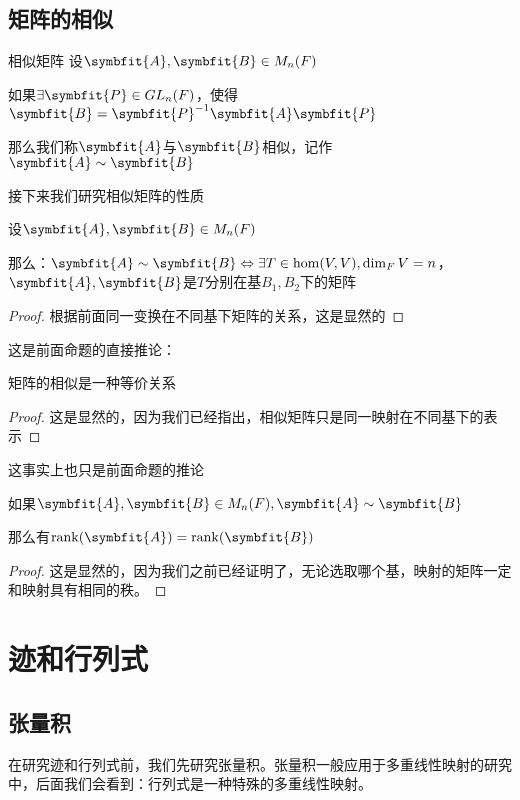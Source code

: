 \documentclass[12pt, a4paper, oneside, UTF8]{ctexbook}
\begin{document}
		\subsection{矩阵的相似}
			\begin{defn}{相似矩阵}{}
				设$\symbfit{A},\symbfit{B}\in M_n(F)$

				如果$\exists \symbfit{P} \in GL_n(F)$，使得$\symbfit{B}=\symbfit{P}^{-1}\symbfit{A}\symbfit{P}$

				那么我们称$\symbfit{A}$与$\symbfit{B}$相似，记作$\symbfit{A} \sim \symbfit{B}$
			\end{defn}
			接下来我们研究相似矩阵的性质
			\begin{para}{0}
				\point{}
					\begin{proposition}
						设$\symbfit{A},\symbfit{B} \in M_n(F)$
						
						那么：$\symbfit{A} \sim \symbfit{B} \Leftrightarrow \exists T \in \hom(V,V),\dim_F V = n$，$\symbfit{A},\symbfit{B}$是$T$分别在基$B_1,B_2$下的矩阵
					\end{proposition}
					\begin{proof}
						根据前面同一变换在不同基下矩阵的关系，这是显然的
					\end{proof}
					
					这是前面命题的直接推论：
					\begin{corollary}
						矩阵的相似是一种等价关系
					\end{corollary}
					\begin{proof}
						这是显然的，因为我们已经指出，相似矩阵只是同一映射在不同基下的表示
					\end{proof}

					这事实上也只是前面命题的推论
					\begin{corollary}
						如果$\symbfit{A},\symbfit{B} \in M_n(F),\symbfit{A}\sim \symbfit{B}$

						那么有$\rank(\symbfit{A})=\rank(\symbfit{B})$
					\end{corollary}
					\begin{proof}
						这是显然的，因为我们之前已经证明了，无论选取哪个基，映射的矩阵一定和映射具有相同的秩。
					\end{proof}
			\end{para}
	\section{迹和行列式}
		\subsection{张量积}
			在研究迹和行列式前，我们先研究张量积。张量积一般应用于多重线性映射的研究中，后面我们会看到：行列式是一种特殊的多重线性映射。
\end{document}

